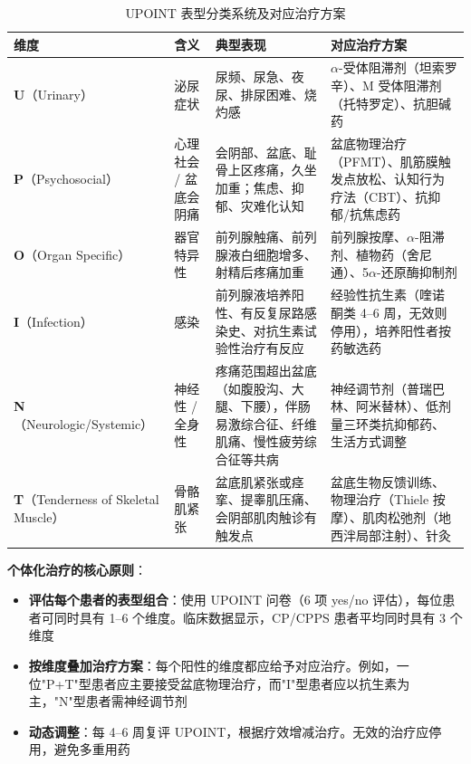 \begin{enumerate}
\begin{table}[htbp]
\centering
\caption{UPOINT 表型分类系统及对应治疗方案}
\label{tab:upoint}
\begin{tabularx}{\textwidth}{@{}llXX@{}}
    \toprule
    \textbf{维度} & \textbf{含义} & \textbf{典型表现} & \textbf{对应治疗方案} \\
    \midrule
    \textbf{U}（Urinary） & 泌尿症状 & 尿频、尿急、夜尿、排尿困难、烧灼感 & $\alpha$-受体阻滞剂（坦索罗辛）、M 受体阻滞剂（托特罗定）、抗胆碱药 \\
    \textbf{P}（Psychosocial） & 心理社会 / 盆底会阴痛 & 会阴部、盆底、耻骨上区疼痛，久坐加重；焦虑、抑郁、灾难化认知 & 盆底物理治疗（PFMT）、肌筋膜触发点放松、认知行为疗法（CBT）、抗抑郁/抗焦虑药 \\
    \textbf{O}（Organ Specific） & 器官特异性 & 前列腺触痛、前列腺液白细胞增多、射精后疼痛加重 & 前列腺按摩、$\alpha$-阻滞剂、植物药（舍尼通）、5$\alpha$-还原酶抑制剂 \\
    \textbf{I}（Infection） & 感染 & 前列腺液培养阳性、有反复尿路感染史、对抗生素试验性治疗有反应 & 经验性抗生素（喹诺酮类 4--6 周，无效则停用），培养阳性者按药敏选药 \\
    \textbf{N}（Neurologic/Systemic） & 神经性 / 全身性 & 疼痛范围超出盆底（如腹股沟、大腿、下腰），伴肠易激综合征、纤维肌痛、慢性疲劳综合征等共病 & 神经调节剂（普瑞巴林、阿米替林）、低剂量三环类抗抑郁药、生活方式调整 \\
    \textbf{T}（Tenderness of Skeletal Muscle） & 骨骼肌紧张 & 盆底肌紧张或痉挛、提睾肌压痛、会阴部肌肉触诊有触发点 & 盆底生物反馈训练、物理治疗（Thiele 按摩）、肌肉松弛剂（地西泮局部注射）、针灸 \\
    \bottomrule
\end{tabularx}
\end{table}

\vspace{0.5em}
\noindent\textbf{个体化治疗的核心原则}：

\begin{itemize}[leftmargin=2cm]
	\item \textbf{评估每个患者的表型组合}：使用 UPOINT 问卷（6 项 yes/no 评估），每位患者可同时具有 1--6 个维度。临床数据显示，CP/CPPS 患者平均同时具有 3 个维度
	\item \textbf{按维度叠加治疗方案}：每个阳性的维度都应给予对应治疗。例如，一位"P+T"型患者应主要接受盆底物理治疗，而"I"型患者应以抗生素为主，"N"型患者需神经调节剂
	\item \textbf{动态调整}：每 4--6 周复评 UPOINT，根据疗效增减治疗。无效的治疗应停用，避免多重用药
\end{itemize}


\end{enumerate}
